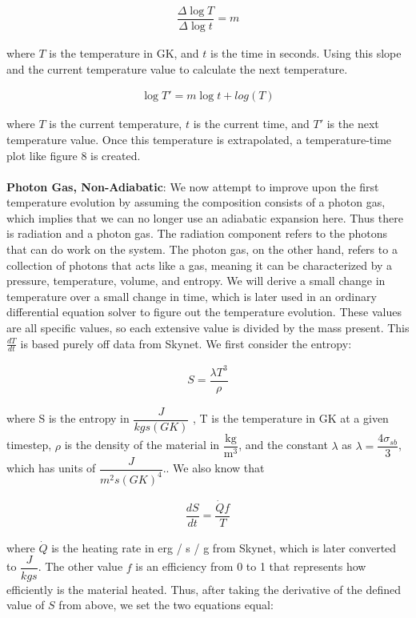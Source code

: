 \documentclass[11pt,a4paper]{article}
\begin{document}
\begin{align}
	\dfrac{\Delta \log{T}}{\Delta \log{t}} = m 
\end{align}

where $T$ is the temperature in GK, and $t$ is the time in seconds. Using this slope and the current temperature value to calculate the next temperature. 

\begin{align}
	\log{T'} = m \log{t} + log(T)
\end{align}

where $T$ is the current temperature, $t$ is the current time, and $T'$ is the next temperature value. Once this temperature is extrapolated, a temperature-time plot like figure 8 is created.  \\\\

\textbf{Photon Gas, Non-Adiabatic}: We now attempt to improve upon the first temperature evolution by assuming the composition consists of a photon gas, which implies that we can no longer use an adiabatic expansion here. Thus there is radiation and a photon gas. The radiation component refers to the photons that can do work on the system. The photon gas, on the other hand, refers to a collection of photons that acts like a gas, meaning it can be characterized by a pressure, temperature, volume, and entropy. We will derive a small change in temperature over a small change in time, which is later used in an ordinary differential equation solver to figure out the temperature evolution. These values are all specific values, so each extensive value is divided by the mass present. This $\frac{dT}{dt}$ is based purely off data from Skynet. We first consider the entropy:

\begin{align}
	S = \dfrac{\lambda T^3}{\rho}
\end{align}

where S is the entropy in $\dfrac{J}{kg s (GK)}$ , T is the temperature in GK at a given timestep, $\rho$ is the density of the material in $\mathrm{\dfrac{kg}{m^3}}$, and the constant $\lambda$ as $\lambda =  \dfrac{4 \sigma_{sb}}{3}$, which has units of $\dfrac{J}{m^2 s ({GK})^4}$.. We also know that 

\begin{align}
	\dfrac{dS}{dt} = \dfrac{\dot{Q} f}{T}
\end{align}

where $\dot{Q}$ is the heating rate in erg / s / g from Skynet, which is later converted to $\dfrac{J}{kg s}$. The other value $f$ is an efficiency from 0 to 1 that represents how efficiently is the material heated. Thus, after taking the derivative of the defined value of $S$ from above, we set the two equations equal: 
\end{document}

